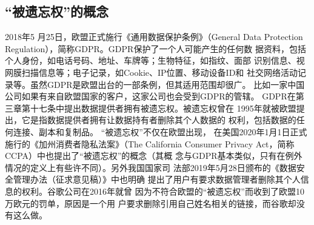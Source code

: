\subsection{“被遗忘权”的概念}
2018年5 月25日，欧盟正式施行《通用数据保护条例》（General Data
Protection Regulation）\cite{gdpr2018}，简称GDPR。GDPR保护了一个人可能产生的任何数
据资料，包括个人身份，如电话号码、地址、车牌等；生物特征，如指纹、面部
识别信息、视网膜扫描信息等；电子记录，如Cookie、IP位置、移动设备ID和
社交网络活动记录等。虽然GDPR是欧盟出台的一部条例，但其适用范围却很广\cite{visser2017,10.1007/978-3-030-21752-5_4,Kwak2017LetMU,Francesco2018}。
比如一家中国公司如果有来自欧盟国家的客户，这家公司也会受到GDPR的管辖。
GDPR在第三章第十七条中提出数据提供者拥有被遗忘权\cite{sarkar:hal-01824058,VILLARONGA2018304}。被遗忘权曾在
1995年就被欧盟提出，它是指数据提供者拥有让数据持有者删除其个人数据的
权利，包括数据的任何连接、副本和复制品。 “被遗忘权”不仅在欧盟出现，
在美国2020年1月1日正式施行的《加州消费者隐私法案》（The California
Consumer Privacy Act，简称CCPA）\cite{ccpa2020}中也提出了“被遗忘权”的概念（其概
念与GDPR基本类似，只有在例外情况的定义上有些许不同）。另外我国国家司
法部2019年5月28日颁布的《数据安全管理办法（征求意见稿）》\cite{gbt35273}中也明确
提出了用户有要求数据管理者删除其个人信息的权利。谷歌公司在2016年就曾
因为不符合欧盟的“被遗忘权”而收到了欧盟10万欧元的罚单，原因是一个用
户要求删除引用自己姓名相关的链接，而谷歌却没有这么做\cite{caipeiru2019}。




